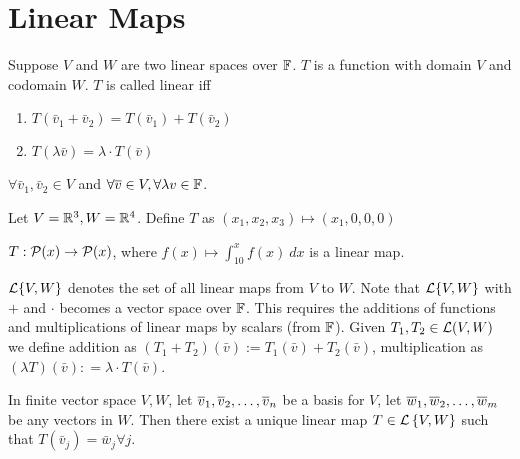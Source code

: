 \section{Linear Maps}
\begin{center}
\end{center}

Suppose $V$ and $W$ are two linear spaces over $\mathbb F$. $T$ is a function with domain $V$ and codomain $W$. $T$ is called linear iff 
\begin{enumerate}
    \item $T(\bar v_1 + \bar v_2) = T(\bar v_1) + T(\bar v_2)$
    \item $T(\lambda \bar v) = \lambda \cdot T(\bar v)$
\end{enumerate}
$\forall \bar{v}_1, \bar{v}_2 \in V$ and $\forall \overline{v} \in V, \forall \lambda v \in \mathbb F$.
\begin{example}
    Let $V = \mathbb R^3, W = \mathbb R^4$. Define $T$ as $(x_1, x_2, x_3) \mapsto (x_1,0,0,0)$
\end{example}
\begin{example}
    $T: \mathcal P(x) \to \mathcal P(x)$, where $\displaystyle f(x) \mapsto \int_{10}^x f(x) \ dx$ is a linear map.
\end{example}
\begin{definition}
    $\mathcal L\{V, W\}$ denotes the set of all linear maps from $V$ to $W$. Note that $\mathcal L\{V, W\}$ with $+$ and $\cdot$ becomes a vector space over $\mathbb F$. This requires the additions of functions and multiplications of linear maps by scalars (from $\mathbb F$). Given $T_1, T_2 \in \mathcal L(V,W)$ we define addition as $(T_1 + T_2)(\bar v) := T_1(\bar v) + T_2(\bar v)$, multiplication as $(\lambda T)(\bar v) : = \lambda \cdot T(\bar v)$. 
\end{definition}
\begin{theorem}
    In finite vector space $V,W$, let ${\overline v}_1,{\overline v}_2, \ldots, {\overline v}_{n}$ be a basis for $V$, let ${\overline w}_1,{\overline w}_2, \ldots, {\overline w}_{m}$ be any vectors in $W$. Then there exist a unique linear map $T \in \mathcal L \left\{ V, W \right\}$ such that $T(\bar v_j) = \bar w_j \forall j$.
\end{theorem}
